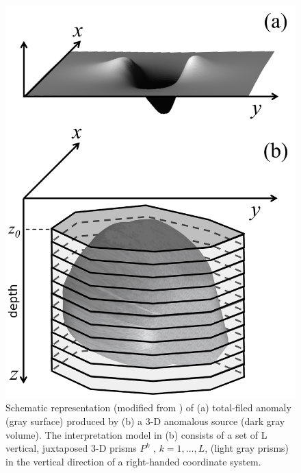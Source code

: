
\begin{figure}
    \centering
    \includegraphics[scale=1]{figures/observed_data.png}
    \caption{Schematic representation (modified from \cite{oliveirajr-barbosa2013}) of (a) total-filed anomaly (gray surface) produced by (b) a 3-D anomalous source (dark gray volume). The interpretation model in (b) consists of a set of L vertical, juxtaposed 3-D prisms $P^k$ , $k = 1,\dots, L$, (light gray prisms) in the vertical direction of a right-handed coordinate system.}
    \label{fig:obs}
\end{figure}

